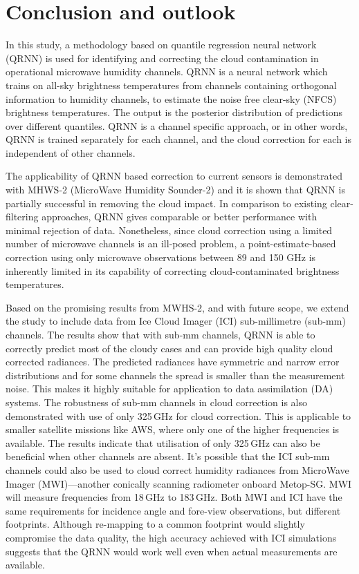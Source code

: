 \documentclass[amt, manuscript]{copernicus}
\begin{document}
\section{Conclusion and outlook}  
\label{conclusions}
%

In this study, a methodology based on quantile regression neural network (QRNN) is used for identifying and correcting the cloud contamination in operational microwave humidity channels. QRNN is a neural network which trains on all-sky brightness temperatures from channels containing orthogonal information to humidity channels, to estimate the noise free clear-sky (NFCS) brightness temperatures. The output is the posterior distribution of predictions over different quantiles. QRNN is a channel specific approach, or in other words, QRNN is trained separately for each channel, and the cloud correction for each is independent of other channels. 

The applicability of QRNN based correction to current sensors is demonstrated with MHWS-2 (MicroWave Humidity Sounder-2) and it is shown that QRNN is partially successful in removing the cloud impact. In comparison to existing clear-filtering approaches, QRNN gives comparable or better performance with minimal rejection of data. Nonetheless, since cloud correction
using a limited number of microwave channels is an ill-posed problem, a point-estimate-based correction using only microwave observations between 89 and 150 GHz is inherently limited in its capability of correcting cloud-contaminated brightness temperatures. 

Based on the promising results from MWHS-2, and with future scope, we extend the study to include data from Ice Cloud Imager (ICI) sub-millimetre (sub-mm) channels. The results show that with  sub-mm channels, QRNN is able to correctly predict most of the cloudy cases and can provide high quality cloud corrected radiances. The predicted radiances have symmetric and narrow error distributions and for some channels the spread is smaller than the measurement noise. This makes it highly suitable for application to data assimilation (DA) systems. The robustness of sub-mm channels in cloud correction is also demonstrated with use of only 325\,GHz for cloud correction. This is applicable to smaller satellite missions like AWS, where only one of the higher frequencies is available. The results indicate that utilisation of only 325\,GHz can also be beneficial when other channels are absent. It's possible that the ICI sub-mm channels could also be used to cloud correct humidity radiances from MicroWave Imager (MWI)---another conically scanning radiometer onboard Metop-SG. MWI will measure frequencies from 18\,GHz to 183\,GHz. Both MWI and ICI have the same requirements for incidence angle and fore-view observations, but different footprints. Although re-mapping to a common footprint  would slightly compromise the data quality, the high accuracy achieved with ICI simulations suggests that the QRNN would work well even when actual measurements are available.
\end{document}
